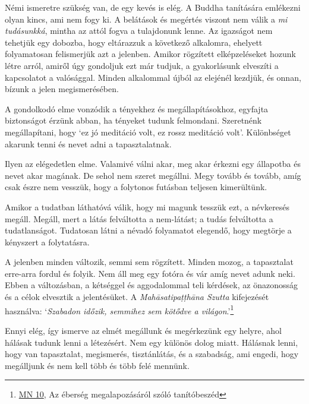 
Némi ismeretre szükség van, de egy kevés is elég. A Buddha tanítására
emlékezni olyan kincs, ami nem fogy ki. A belátások és megértés viszont
nem válik a \emph{mi tudásunkká}, mintha az attól fogva a tulajdonunk
lenne. Az igazságot nem tehetjük egy dobozba, hogy eltárazzuk a
következő alkalomra, ehelyett folyamatosan felismerjük azt a jelenben.
Amikor rögzített elképzeléseket hozunk létre arról, amiről úgy gondoljuk
ezt már tudjuk, a gyakorlásunk elveszíti a kapcsolatot a valósággal.
Minden alkalommal újból az elejénél kezdjük, és onnan, bízunk a jelen
megismerésében.

A gondolkodó elme vonzódik a tényekhez és megállapításokhoz, egyfajta
biztonságot érzünk abban, ha tényeket tudunk felmondani. Szeretnénk
megállapítani, hogy `ez jó meditáció volt, ez rossz meditáció volt'.
Különbséget akarunk tenni és nevet adni a tapasztalatnak.

Ilyen az elégedetlen elme. Valamivé válni akar, meg akar érkezni egy
állapotba és nevet akar magának. De sehol nem szeret megállni. Megy
tovább és tovább, amíg csak észre nem vesszük, hogy a folytonos futásban
teljesen kimerültünk.

Amikor a tudatban láthatóvá válik, hogy mi magunk tesszük ezt, a
névkeresés megáll. Megáll, mert a látás felváltotta a nem-látást; a
tudás felváltotta a tudatlanságot. Tudatosan látni a névadó folyamatot
elegendő, hogy megtörje a kényszert a folytatásra.

A jelenben minden változik, semmi sem rögzített. Minden mozog, a
tapasztalat erre-arra fordul és folyik. Nem áll meg egy fotóra és vár
amíg nevet adunk neki. Ebben a változásban, a kétséggel és aggodalommal
teli kérdések, az önazonosság és a célok elvesztik a jelentésüket. A
\emph{Mahāsatipaṭṭhāna Szutta} kifejezését használva: `\emph{Szabadon
időzik, semmihez sem kötődve a világon}.'\footnote{\href{https://a-buddha-ujja.hu/mn-10/hu/toth-zsuzsanna}{MN
  10}, Az éberség megalapozásáról szóló tanítóbeszéd}

Ennyi elég, így ismerve az elmét megállunk és megérkezünk egy helyre,
ahol hálásak tudunk lenni a létezésért. Nem egy különös dolog miatt.
Hálásnak lenni, hogy van tapasztalat, megismerés, tisztánlátás, és a
szabadság, ami engedi, hogy megálljunk és nem kell több és több felé
mennünk.


